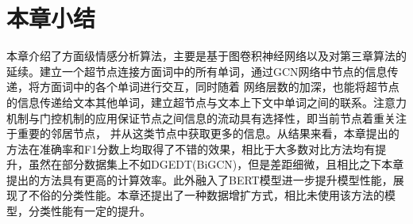 \section{本章小结}
本章介绍了方面级情感分析算法，主要是基于图卷积神经网络以及对第三章算法的延续。建立一个超节点连接方面词中的所有单词，通过GCN网络中节点的信息传递，将方面词中的各个单词进行交互，同时随着
网络层数的加深，也能将超节点的信息传递给文本其他单词，建立超节点与文本上下文中单词之间的联系。注意力机制与门控机制的应用保证节点之间信息的流动具有选择性，即当前节点着重关注于重要的邻居节点，
并从这类节点中获取更多的信息。从结果来看，本章提出的方法在准确率和F1分数上均取得了不错的效果，相比于大多数对比方法均有提升，虽然在部分数据集上不如DGEDT(BiGCN)，但是差距细微，且相比之下本章
提出的方法具有更高的计算效率。此外融入了BERT模型进一步提升模型性能，展现了不俗的分类性能。本章还提出了一种数据增扩方式，相比未使用该方法的模型，分类性能有一定的提升。
